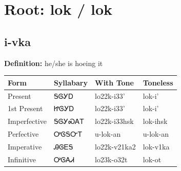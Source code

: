 \documentclass{article}%
\begin{document}
%
\normalsize%
\section*{Root: lok / lok}%
\subsection*{i-vka}%
\textbf{Definition: }%
he/she is hoeing it%
\\[0.5em]%
\begin{tabular}{|l|l|l|l|}%
\hline%
\textbf{Form}&\textbf{Syllabary}&\textbf{With Tone}&\textbf{Toneless}\\%
\hline%
Present&ᎦᎶᎩᎠ&lo22k{-}i33'&lok{-}i'\\%
1st Present&ᏥᎶᎩᎠ&lo22k{-}i33'&lok{-}i'\\%
Imperfective&ᎦᎶᎩᏍᎪᎢ&lo22k{-}i33hsk&lok{-}ihsk\\%
Perfective&ᎤᎶᎦᏅᎢ&u{-}lok{-}an&u{-}lok{-}an\\%
Imperative&ᎯᎶᎬᎦ&lo22k{-}v21ka2&lok{-}v1ka\\%
Infinitive&ᎤᎶᎪᏗ&lo23k{-}o32t&lok{-}ot\\%
\hline%
\end{tabular}%
\\[1em]%
\end{document}
